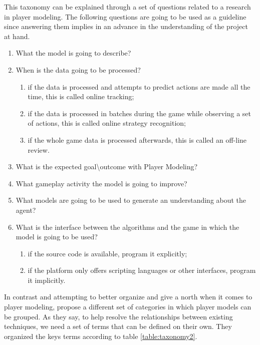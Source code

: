 This taxonomy can be explained through a set of questions related to a research in player modeling. The following questions are going to be used as a guideline since answering them implies in an advance in the understanding of the project at hand.

\begin{enumerate}
	\item What the model is going to describe?
	\item When is the data going to be processed?
	      \begin{enumerate}
		      \item if the data is processed and attempts to predict actions are made all the time, this is called online tracking;
		      \item if the data is processed in batches during the game while observing a set of actions, this is called online strategy recognition;
		      \item if the whole game data is processed afterwards, this is called an off-line review.
	      \end{enumerate}
	\item What is the expected goal\textbackslash{}outcome with Player Modeling?
	\item What gameplay activity the model is going to improve?
	\item What models are going to be used to generate an understanding about the agent?
	\item What is the interface between the algorithms and the game in which the model is going to be used?
	      \begin{enumerate}
		      \item if the source code is available, program it explicitly;
		      \item if the platform only offers scripting languages or other interfaces, program it implicitly.
	      \end{enumerate}
\end{enumerate}

In contrast and attempting to better organize and give a north when it comes to player modeling, \citep{SmithInclusiveTaxonomyPlayer} propose a different set of categories in which player models can be grouped. As they say, to help resolve the relationships between existing techniques, we need a set of terms that can be defined on
their own. They organized the keys terms according to table \ref{table:taxonomy2}.

